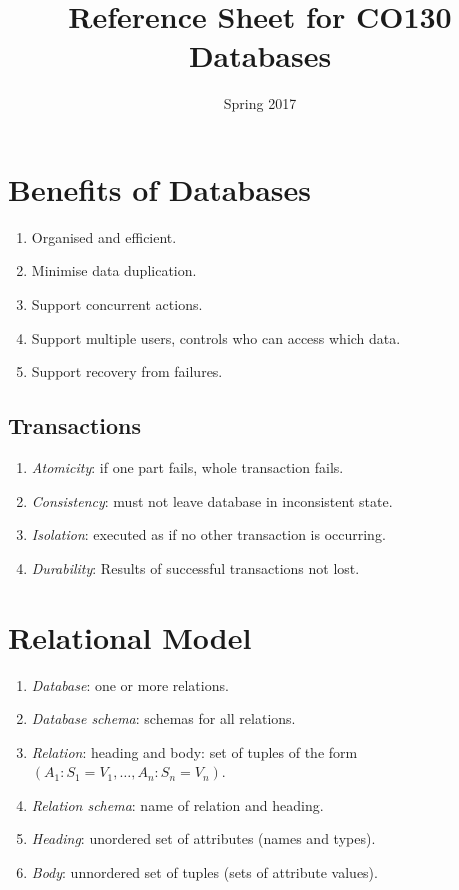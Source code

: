 \documentclass[twocolumn,english]{article}
\begin{document}
\title{Reference Sheet for CO130 Databases}


\date{Spring 2017}

\maketitle

\section{Benefits of Databases}
\begin{enumerate}
\item Organised and efficient.
\item Minimise data duplication.
\item Support concurrent actions.
\item Support multiple users, controls who can access which data.
\item Support recovery from failures.
\end{enumerate}

\subsection{Transactions}
\begin{enumerate}
\item \emph{Atomicity}: if one part fails, whole transaction fails.
\item \emph{Consistency}: must not leave database in inconsistent state.
\item \emph{Isolation}: executed as if no other transaction is occurring.
\item \emph{Durability}: Results of successful transactions not lost.
\end{enumerate}

\section{Relational Model}
\begin{enumerate}
\item \emph{Database}: one or more relations.
\item \emph{Database schema}: schemas for all relations.
\item \emph{Relation}: heading and body: set of tuples of the form $\left(A_{1}:S_{1}=V_{1},\dots,A_{n}:S_{n}=V_{n}\right)$.
\item \emph{Relation schema}: name of relation and heading.
\item \emph{Heading}: unordered set of attributes (names and types).
\item \emph{Body}: unnordered set of tuples (sets of attribute values).
\end{enumerate}
\end{document}
